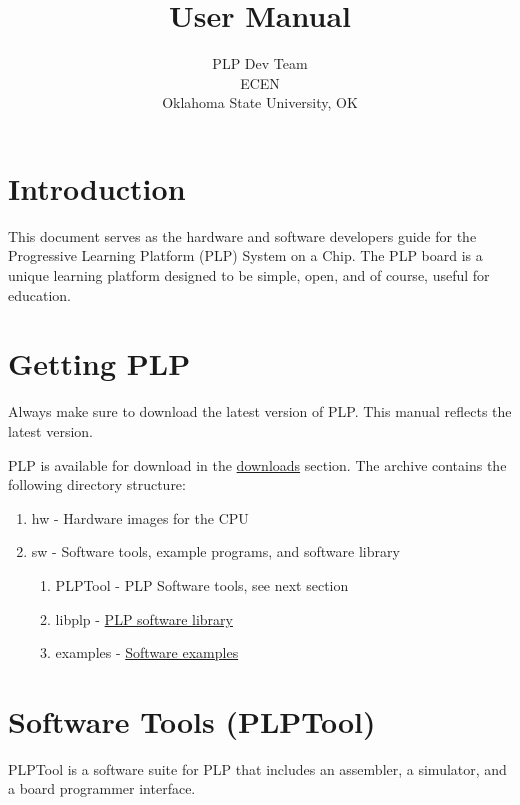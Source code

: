 \documentclass{article}
\begin{document}
\title{User Manual}
\author{PLP Dev Team\\
        ECEN \\
        Oklahoma State University, OK}
        
\maketitle
\pagebreak
\tableofcontents

\section{Introduction}
This document serves as the hardware and software developers guide for the 
Progressive Learning Platform (PLP) System on a Chip. The PLP board is a 
unique learning platform designed to be simple, open, and of course, useful 
for education. 
\section{Getting PLP}
Always make sure to download the latest version of PLP. This manual 
reflects the latest version.

PLP is available for download in the 
\href{http://code.google.com/p/progressive-learning-platform/downloads/list}{downloads}
section. The archive contains the following directory structure:

\begin{enumerate}
\item hw - Hardware images for the CPU
\item sw - Software tools, example programs, and software library
	\begin{enumerate}
	\item PLPTool - PLP Software tools, see next section
	\item libplp - \href{http://code.google.com/p/progressive-learning-platform/wiki/libplp}{PLP software library}
	\item examples - \href{http://code.google.com/p/progressive-learning-platform/wiki/SoftwareExamples}{Software examples}
	\end{enumerate} 
\end{enumerate} 

\section{Software Tools (PLPTool)}
PLPTool is a software suite for PLP that includes an assembler, a simulator, 
and a board programmer interface. 
\end{document}
